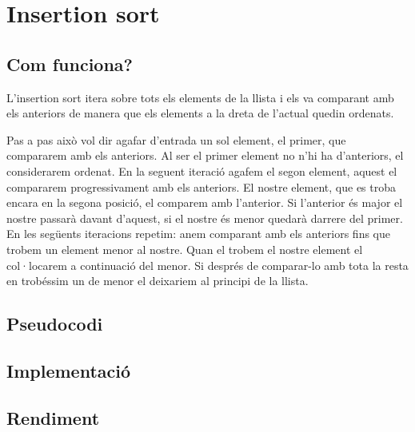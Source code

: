 \chapter{Insertion sort}

\section{Com funciona?}
L'insertion sort itera sobre tots els elements de la llista i els va comparant amb els anteriors de manera que els elements a la dreta de l'actual quedin ordenats.

Pas a pas això vol dir agafar d'entrada un sol element, el primer, que compararem amb els anteriors. Al ser el primer element no n'hi ha d'anteriors, el considerarem ordenat.
En la seguent iteració agafem el segon element, aquest el compararem progressivament amb els anteriors. El nostre element, que es troba encara en la segona posició, el comparem amb l'anterior. Si l'anterior és major el nostre passarà davant d'aquest, si el nostre és menor quedarà darrere del primer.
En les següents iteracions repetim: anem comparant amb els anteriors fins que trobem un element menor al nostre. Quan el trobem el nostre element el col·locarem a continuació del menor. Si després de comparar-lo amb tota la resta en trobéssim un de menor el deixariem al principi de la llista.
\section{Pseudocodi}
\section{Implementació}

\section{Rendiment}

